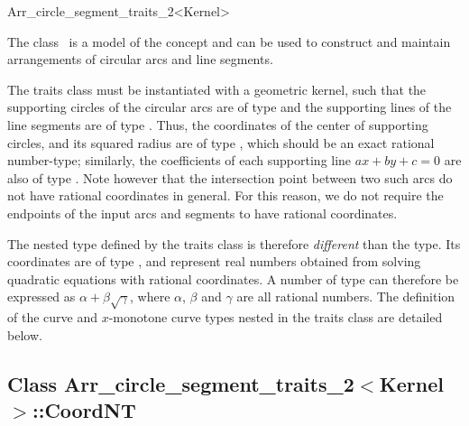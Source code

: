 
\ccRefPageBegin
\begin{ccRefClass}{Arr_circle_segment_traits_2<Kernel>}

\ccDefinition

The class \ccRefName\ is a model of the  concept
and can be used to construct and maintain arrangements of circular arcs
and line segments.

The traits class must be instantiated with a geometric kernel, such that
the supporting circles of the circular arcs are of type 
and the supporting lines of the line segments are of type .
Thus, the coordinates of the center of supporting circles, and its squared
radius are of type , which should be an exact rational
number-type; similarly, the coefficients of each supporting line
$ax + by + c = 0$ are also of type . Note however that
the intersection point between two such arcs do not have rational coordinates
in general. For this reason, we do not require the endpoints of the input arcs
and segments to have rational coordinates.

The nested  type defined by the traits class is therefore
{\em different} than the  type. Its coordinates are
of type , and represent real numbers obtained from solving
quadratic equations with rational coordinates. A number of type
 can therefore be expressed as $\alpha + \beta\sqrt{\gamma}$,
where $\alpha$, $\beta$ and $\gamma$ are all rational numbers.
The definition of the curve and $x$-monotone curve types nested in the
traits class are detailed below.

 
\ccIsModel

\subsection*{Class 
Arr\_circle\_segment\_traits\_2$<$Kernel$>$::CoordNT}


\end{ccRefClass}

